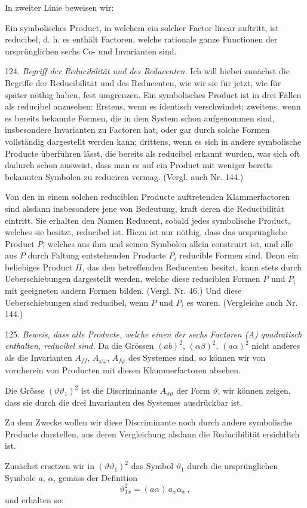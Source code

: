 In zweiter Linie beweisen wir:

\glqq Ein symbolisches Product, in welchem ein solcher Factor linear auftritt, ist reducibel, d. h. es enthält Factoren, welche rationale ganze Functionen der ursprünglichen sechs Co- und Invarianten sind.\grqq{}


124. \textit{Begriff der Reducibilität und des Reducenten.} Ich will hiebei zunächst die Begriffe der Reducibilität und des Reducenten, wie wir sie für jetzt, wie für später n\"othig haben, fest umgrenzen. Ein symbolisches Product ist in drei Fällen als reducibel anzusehen: Erstens, wenn es identisch verschwindet; zweitens, wenn es bereits bekannte Formen, die in dem System schon aufgenommen sind, insbesondere Invarianten zu Factoren hat, oder gar durch solche Formen vollständig dargestellt werden kann; drittens, wenn es sich in andere symbolische Producte überführen lässt, die bereits als reducibel erkannt wurden, was sich oft dadurch schon ausweist, dass man es auf ein Product mit weniger bereits bekannten Symbolen zu reduciren vermag. (Vergl. auch Nr. 144.)

Von den in einem solchen reduciblen Producte auftretenden Klammerfactoren sind alsdann insbesondere jene von Bedeutung, kraft deren die Reducibilität eintritt. Sie erhalten den Namen \glqq Reducent\grqq{}, sobald jedes symbolische Product, welches sie besitzt, reducibel ist. Hiezu ist nur n\"othig, dass das ursprüngliche Product $P$, welches aus ihm und seinen Symbolen allein construirt ist, und alle aus $P$ durch Faltung entstehenden Producte $P_i$ reducible Formen sind. Denn ein beliebiges Product $\Pi$, das den betreffenden Reducenten besitzt, kann stets durch Ueberschiebungen dargestellt werden, welche diese reduciblen Formen $P$ und $P_i$ mit geeigneten andern Formen bilden. (Vergl. Nr. 46.) Und diese Ueberschiebungen sind reducibel, wenn $P$ und $P_i$ es waren. (Vergleiche auch Nr. 144.)

125. \textit{Beweis, dass alle Producte, welche einen der sechs Factoren (A) quadratisch enthalten, reducibel sind.} Da die Grössen $(ab)^2$, $(\alpha\beta)^2$, $(a\alpha)^2$ nicht anderes als die Invarianten $A_{ff}$, $A_{\varphi\varphi}$, $A_{f\varphi}$ des Systemes sind, so können wir von vornherein von Producten mit diesen Klammerfactoren absehen.

Die Grösse $(\vartheta\vartheta_1)^2$ ist die Discriminante $A_{\vartheta\vartheta}$ der Form $\vartheta$, wir können zeigen, dass sie durch die drei Invarianten des Systemes ausdrückbar ist.

Zu dem Zwecke wollen wir diese Discriminante noch durch andere symbolische Producte darstellen, aus deren Vergleichung alsdann die Reducibilität ersichtlich ist.

Zunächst ersetzen wir in $(\vartheta\vartheta_1)^2$ das Symbol $\vartheta_1$ durch die ursprünglichen Symbole $a$, $\alpha$, gemäss der Definition
\[
\vartheta_{1x}^2 = (a\alpha)\,a_x \alpha_x\,,
\]
und erhalten so:


